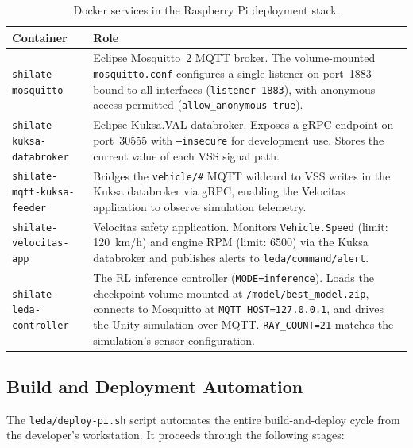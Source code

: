 \begin{table}[H]
\caption{Docker services in the Raspberry Pi deployment stack.}
\label{table:pi-services}
\begin{tabular}{|p{5.2cm}|p{6.3cm}|}
  \hline
  \textbf{Container} & \textbf{Role} \\
  \hline
  \nolinkurl{shilate-mosquitto} &
    Eclipse Mosquitto~2 MQTT broker. The volume-mounted
    \texttt{mosquitto.conf} configures a single listener on port~1883
    bound to all interfaces (\texttt{listener 1883}), with anonymous
    access permitted (\texttt{allow\_anonymous true}). \\
  \hline
  \nolinkurl{shilate-kuksa-databroker} &
    Eclipse Kuksa.VAL databroker. Exposes a gRPC endpoint on
    port~30555 with \texttt{--insecure} for development use.
    Stores the current value of each VSS signal path. \\
  \hline
  \nolinkurl{shilate-mqtt-kuksa-feeder} &
    Bridges the \texttt{vehicle/\#} MQTT wildcard to VSS writes in
    the Kuksa databroker via gRPC, enabling the Velocitas application
    to observe simulation telemetry. \\
  \hline
  \nolinkurl{shilate-velocitas-app} &
    Velocitas safety application. Monitors \texttt{Vehicle.Speed}
    (limit: 120~km/h) and engine RPM (limit: 6500) via the Kuksa
    databroker and publishes alerts to \texttt{leda/command/alert}. \\
  \hline
  \nolinkurl{shilate-leda-controller} &
    The RL inference controller (\texttt{MODE=inference}).
    Loads the checkpoint volume-mounted at \texttt{/model/best\_model.zip},
    connects to Mosquitto at \texttt{MQTT\_HOST=127.0.0.1},
    and drives the Unity simulation over MQTT.
    \texttt{RAY\_COUNT=21} matches the simulation's sensor
    configuration. \\
  \hline
\end{tabular}
\end{table}

\subsection{Build and Deployment Automation}
\label{sec:pi-build}

The \texttt{leda/deploy-pi.sh} script automates the entire
build-and-deploy cycle from the developer's workstation. It proceeds
through the following stages:

